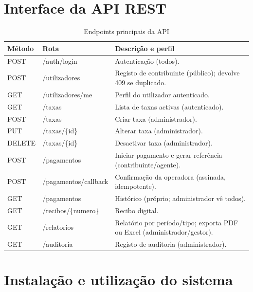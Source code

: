\documentclass[12pt,a4paper,openany]{report}
\begin{document}
\chapter{Interface da API REST}
\begin{table}[!htbp]
\caption{Endpoints principais da API}\label{tab:api}
\begingroup\singlespacing\small
\begin{tabularx}{\textwidth}{@{}>{\ttfamily}p{1.6cm}>{\ttfamily}p{5cm}X@{}}
\toprule
\textrm{Método} & \textrm{Rota} & Descrição e perfil \\
\midrule
POST & /auth/login & Autenticação (todos). \\
POST & /utilizadores & Registo de contribuinte (público); devolve 409 se duplicado. \\
GET & /utilizadores/me & Perfil do utilizador autenticado. \\
GET & /taxas & Lista de taxas activas (autenticado). \\
POST & /taxas & Criar taxa (administrador). \\
PUT & /taxas/\{id\} & Alterar taxa (administrador). \\
DELETE & /taxas/\{id\} & Desactivar taxa (administrador). \\
POST & /pagamentos & Iniciar pagamento e gerar referência (contribuinte/agente). \\
POST & /pagamentos/callback & Confirmação da operadora (assinada, idempotente). \\
GET & /pagamentos & Histórico (próprio; administrador vê todos). \\
GET & /recibos/\{numero\} & Recibo digital. \\
GET & /relatorios & Relatório por período/tipo; exporta PDF ou Excel (administrador/gestor). \\
GET & /auditoria & Registo de auditoria (administrador). \\
\bottomrule
\end{tabularx}
\endgroup
\end{table}

\chapter{Instalação e utilização do sistema}
\end{document}
